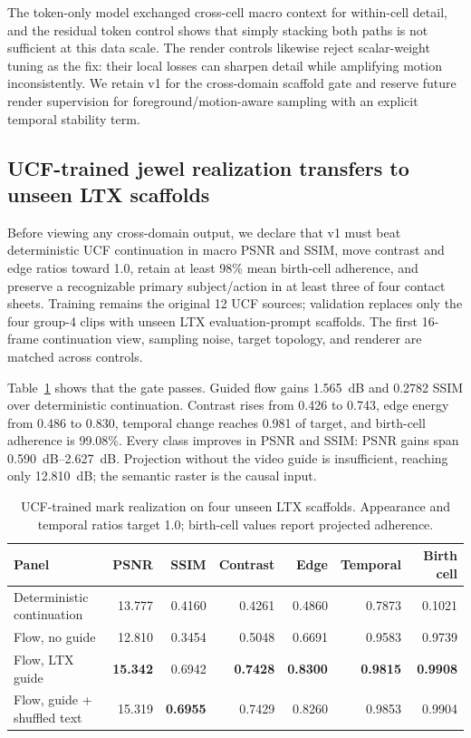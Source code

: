 \documentclass[10pt]{article}
\begin{document}
The token-only model exchanged cross-cell macro context for within-cell detail, and the residual
token control shows that simply stacking both paths is not sufficient at this data scale. The
render controls likewise reject scalar-weight tuning as the fix: their local losses can sharpen
detail while amplifying motion inconsistently. We retain v1 for the cross-domain scaffold gate and
reserve future render supervision for foreground/motion-aware sampling with an explicit temporal
stability term.

\subsection{UCF-trained jewel realization transfers to unseen LTX scaffolds}

Before viewing any cross-domain output, we declare that v1 must beat deterministic UCF continuation
in macro PSNR and SSIM, move contrast and edge ratios toward 1.0, retain at least 98\% mean
birth-cell adherence, and preserve a recognizable primary subject/action in at least three of four
contact sheets. Training remains the original 12 UCF sources; validation replaces only the four
group-4 clips with unseen LTX evaluation-prompt scaffolds. The first 16-frame continuation view,
sampling noise, target topology, and renderer are matched across controls.

Table~\ref{tab:ltxtransfer} shows that the gate passes. Guided flow gains \SI{1.565}{dB} and 0.2782
SSIM over deterministic continuation. Contrast rises from 0.426 to 0.743, edge energy from 0.486 to
0.830, temporal change reaches 0.981 of target, and birth-cell adherence is 99.08\%. Every class
improves in PSNR and SSIM: PSNR gains span \SIrange{0.590}{2.627}{dB}. Projection without the video
guide is insufficient, reaching only \SI{12.810}{dB}; the semantic raster is the causal input.

\begin{table}[H]
\centering
\small
\caption{UCF-trained mark realization on four unseen LTX scaffolds. Appearance and temporal ratios
target 1.0; birth-cell values report projected adherence.}
\label{tab:ltxtransfer}
\begin{tabular}{@{}lrrrrrr@{}}
\toprule
Panel & PSNR & SSIM & Contrast & Edge & Temporal & Birth cell \\
\midrule
Deterministic continuation & 13.777 & 0.4160 & 0.4261 & 0.4860 & 0.7873 & 0.1021 \\
Flow, no guide & 12.810 & 0.3454 & 0.5048 & 0.6691 & 0.9583 & 0.9739 \\
Flow, LTX guide & \textbf{15.342} & 0.6942 & \textbf{0.7428} & \textbf{0.8300} & \textbf{0.9815} & \textbf{0.9908} \\
Flow, guide + shuffled text & 15.319 & \textbf{0.6955} & 0.7429 & 0.8260 & 0.9853 & 0.9904 \\
\bottomrule
\end{tabular}
\end{table}
\end{document}

